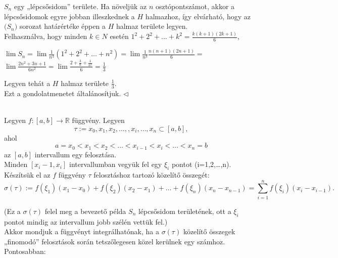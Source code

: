 \documentclass[12pt,margin=0px]{article}
\newcommand\ddfrac[2]{\frac{\displaystyle #1}{\displaystyle #2}}
\begin{document}
{    \noindent $S_n$ egy „lépcsősidom” területe. Ha növeljük az $n$ osztópontszámot, akkor a lépcsősidomok egyre jobban illeszkednek a $H$ halmazhoz, így elvárható, hogy az $\big(S_n\big)$ sorozat határértéke éppen a $H$ halmaz területe legyen.\\
    Felhasználva, hogy minden $k \in N$ esetén $1^2 + 2^2 + \ldots + k^2 = \ddfrac{k(k+1)(2k+1)}{6}$,
    \begin{center}
        $\lim S_n = \lim\ddfrac{1}{n^3} (1^2 + 2^2 + \ldots + n^2) = \lim \ddfrac{1}{n^3}\ddfrac{n(n + 1)(2n + 1)}{6}=$\\
        $\lim \ddfrac{2n^2 + 3n + 1}{6n^2} = \lim\ddfrac{2 + \ddfrac{3}{n} + \ddfrac{1}{n^2}}{6}=\ddfrac{1}{3}$
    \end{center}
    \noindent Legyen tehát a $H$ halmaz területe $\ddfrac{1}{3}$.\\

    \noindent Ezt a gondolatmenetet általánosítjuk.
    $\triangleleft$ \faLightbulbO}\\

    \noindent Legyen $f : [a, b] \to \mathbb{R}$ függvény.
    Legyen
    \[
        \tau := x_0, x_1, x_2, \ldots, , x_i, \ldots, x_n \subset [a, b],
    \]
    ahol
    \[
        a = x_0 < x_1 < x_2 < \ldots < x_{i-1} < x_i < \ldots < x_n = b
    \]
    az $[a,b]$ intervallum egy felosztása.\\

    \noindent Minden $[x_i-1, x_i]$ intervallumban vegyük fel egy $\xi_i$ pontot (i=1,2,\ldots,n). \\

    \noindent Készítsük el az $f$ függvény $\tau$ felosztáshoz tartozó közelítő összegét:
    \[
        \sigma(\tau) := f(\xi_1)(x_1-x_0)+f(\xi_2)(x_2-x_1)+ \ldots + f(\xi_n)(x_n-x_{n-1}) = \sum\limits_{i=1}^{n} f(\xi_i)(x_i-x_{i-1}).
    \]

    \noindent (Ez a $\sigma(\tau)$ felel meg a bevezető példa $S_n$ lépcsősidom területének, ott a $\xi_i$ pontot mindig az intervallum jobb szélén vettük fel.)\\
    Akkor mondjuk a függvényt integrálhatónak, ha a $\sigma(\tau)$ közelítő összegek „finomodó” felosztások során tetszőlegesen közel kerülnek egy számhoz. Pontosabban:\\
\end{document}
